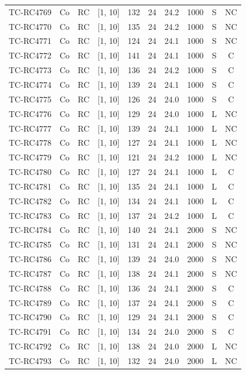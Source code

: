 \begin{longtable}{lccccccccc}
TC-RC4769 & Co & RC & [1, 10] & 132 & 24 & 24.2 & 1000 & S & NC \\
TC-RC4770 & Co & RC & [1, 10] & 135 & 24 & 24.2 & 1000 & S & NC \\
TC-RC4771 & Co & RC & [1, 10] & 124 & 24 & 24.1 & 1000 & S & NC \\
TC-RC4772 & Co & RC & [1, 10] & 141 & 24 & 24.1 & 1000 & S & C \\
TC-RC4773 & Co & RC & [1, 10] & 136 & 24 & 24.2 & 1000 & S & C \\
TC-RC4774 & Co & RC & [1, 10] & 139 & 24 & 24.1 & 1000 & S & C \\
TC-RC4775 & Co & RC & [1, 10] & 126 & 24 & 24.0 & 1000 & S & C \\
TC-RC4776 & Co & RC & [1, 10] & 129 & 24 & 24.0 & 1000 & L & NC \\
TC-RC4777 & Co & RC & [1, 10] & 139 & 24 & 24.1 & 1000 & L & NC \\
TC-RC4778 & Co & RC & [1, 10] & 127 & 24 & 24.1 & 1000 & L & NC \\
TC-RC4779 & Co & RC & [1, 10] & 121 & 24 & 24.2 & 1000 & L & NC \\
TC-RC4780 & Co & RC & [1, 10] & 127 & 24 & 24.1 & 1000 & L & C \\
TC-RC4781 & Co & RC & [1, 10] & 135 & 24 & 24.1 & 1000 & L & C \\
TC-RC4782 & Co & RC & [1, 10] & 134 & 24 & 24.1 & 1000 & L & C \\
TC-RC4783 & Co & RC & [1, 10] & 137 & 24 & 24.2 & 1000 & L & C \\
TC-RC4784 & Co & RC & [1, 10] & 140 & 24 & 24.1 & 2000 & S & NC \\
TC-RC4785 & Co & RC & [1, 10] & 131 & 24 & 24.1 & 2000 & S & NC \\
TC-RC4786 & Co & RC & [1, 10] & 139 & 24 & 24.0 & 2000 & S & NC \\
TC-RC4787 & Co & RC & [1, 10] & 138 & 24 & 24.1 & 2000 & S & NC \\
TC-RC4788 & Co & RC & [1, 10] & 136 & 24 & 24.1 & 2000 & S & C \\
TC-RC4789 & Co & RC & [1, 10] & 137 & 24 & 24.1 & 2000 & S & C \\
TC-RC4790 & Co & RC & [1, 10] & 129 & 24 & 24.1 & 2000 & S & C \\
TC-RC4791 & Co & RC & [1, 10] & 134 & 24 & 24.0 & 2000 & S & C \\
TC-RC4792 & Co & RC & [1, 10] & 138 & 24 & 24.0 & 2000 & L & NC \\
TC-RC4793 & Co & RC & [1, 10] & 132 & 24 & 24.0 & 2000 & L & NC \\

\end{longtable}
